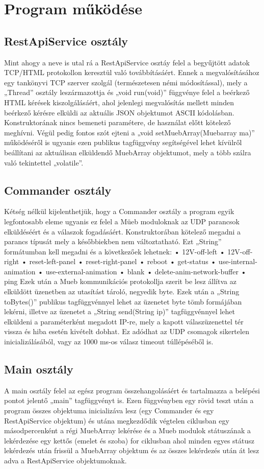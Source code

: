 \documentclass[a4paper,12pt]{article}
\begin{document}
\chapter{Program működése}

\section{RestApiService osztály}

Mint ahogy a neve is utal rá a RestApiService osztáy felel a begyűjtött adatok TCP/HTML protokollon keresztül való továbbításáért. Ennek a megvalósításához egy tankönyvi TCP szerver szolgál (természetesen némi módosítással), mely a „Thread” osztály leszármazottja és „void run(void)” függvénye felel a beérkező HTML kérések kiszolgálásáért, ahol jelenlegi megvalósítás mellett minden beérkező kérésre elküldi az aktuális JSON objektumot ASCII kódolásban. Konstruktorának nincs bemeneti paramétere, de használat előtt kötelező meghívni. Végül pedig fontos szót ejteni a „void setMuebArray(Muebarray ma)” működéséről is ugyanis ezen publikus tagfüggvény segítségével lehet kívülről beállítani az aktuálisan elküldendő MuebArray objektumot, mely a több szálra való tekintettel „volatile”.

\section{Commander osztály}

Kétség nélkül kijelenthetjük, hogy a Commander osztály a program egyik legfontosabb eleme ugyanis ez felel a Müeb moduloknak az UDP parancsok elküldéséért és a válaszok fogadásáért. Konstruktorában kötelező megadni a parancs típusát mely a későbbiekben nem változtatható. Ezt „String” formátumban kell megadni és a következőek lehetnek:
•	12V-off-left
•	12V-off-right
•	reset-left-panel
•	reset-right-panel
•	reboot
•	get-status
•	use-internal-animation
•	use-external-animation
•	blank
•	delete-anim-network-buffer
•	ping
Ezek után a Mueb kommunikációs protokollja szerit be lesz állítva az elküldött üzenetben az utasítást tároló, negyedik byte. Ezek után a „String toBytes()” publikus tagfüggvénnyel lehet az üzenetet byte tömb formájában lekérni, illetve az üzenetet a „String send(String ip)” tagfüggvénnyel lehet elküldeni a paraméterként megadott IP-re, mely a kapott válaszüzenettel tér vissza és hiba esetén kivételt dobhat. Ez adódhat az UDP csomagok sikertelen inicializálásából, vagy az 1000 ms-os válasz timeout túllépéséből is.

\section{Main osztály}

A main osztály felel az egész program összehangolásáért és tartalmazza a belépési pontot jelentő „main” tagfüggvényt is. Ezen függvényben egy rövid teszt után a program összes objektuma inicializáva lesz (egy Commander és egy RestApiService objektum) és utána megkezdődik végtelen ciklusban egy másodpercenként a régi MuebArray lekérése és a Mueb modulok státuszának a lekérdezése egy kettős (emelet és szoba) for ciklusban ahol minden egyes státusz lekérdezés után frissül a MuebArray objektum és az összes lekérdezés után át lesz adva a RestApiService objektumoknak.
\end{document}
